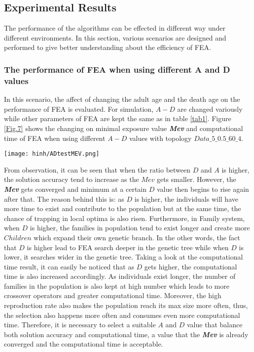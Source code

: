 \documentclass[final]{elsarticle}
\begin{document}
\subsection{Experimental Results}
The performance of the algorithms can be effected in different way under different environments. In this section, various scenarios are designed and performed to give better understanding about the efficiency of FEA.
\subsubsection{The performance of FEA when using different A and D values}
In this scenario, the affect of changing the adult age and the death age on the performance of FEA is evaluated. For simulation, $A - D$ are changed variously while other parameters of FEA are kept the same as in table \ref{tab1}. Figure \ref{Fig.7} shows the changing on minimal exposure value \textit{\textbf{Mev}} and computational time of FEA when using different $A-D$ values with topology $Data\_5\_0.5\_60\_4$.
\begin{figure*}[h]
	\texttt{[image: hinh/ADtestMEV.png]}
	\centering
	\caption{The minimal exposure value when using different A-D values
	}
	\label{Fig.7}       %
\end{figure*}

From observation, it can be seen that when the ratio between $D$ and $A$ is higher, the solution accuracy tend to increase as the $Mev$ gets smaller. However, the \textit{\textbf{Mev}} gets converged and minimum at a certain $D$ value then begins to rise again after that. The reason behind this is: as $D$ is higher, the individuals will have more time to exist and contribute to the population but at the same time, the chance of trapping in local optima is also risen. Furthermore, in Family system, when $D$ is higher, the families in population tend to exist longer and create more $Children $ which expand their own genetic branch. In the other words, the fact that $D$ is higher lead to FEA search deeper in the genetic tree while when $D$ is lower, it searches wider in the genetic tree. Taking a look at the computational time result, it can easily be noticed that as $D$ gets higher, the computational time is also increased accordingly. As individuals exist longer, the number of families in the population is also kept at high number which leads to more crossover operators and greater computational time. Moreover, the high reproduction rate also makes the population reach its max size more often, thus, the selection also happens more often and consumes even more computational time. Therefore, it is necessary to select a suitable $A$ and $D$ value that balance both solution accuracy and computational time, a value that the \textbf{\textit{Mev}} is already converged and the computational time is acceptable.  
\end{document}
